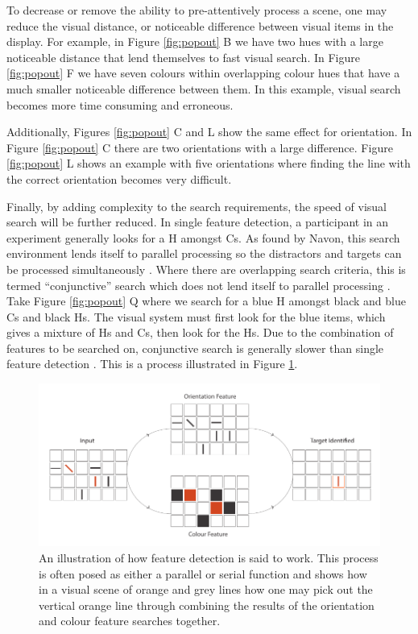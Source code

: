 To decrease or remove the ability to pre-attentively process a scene, one may reduce the visual distance, or noticeable difference between visual items in the display.
For example, in Figure \ref{fig:popout} B we have two hues with a large noticeable distance that lend themselves to fast visual search.
In Figure \ref{fig:popout} F we have seven colours within overlapping colour hues that have a much smaller noticeable difference between them.
In this example, visual search becomes more time consuming and erroneous.

Additionally, Figures \ref{fig:popout} C and L show the same effect for orientation.
In Figure \ref{fig:popout} C there are two orientations with a large difference.
Figure \ref{fig:popout} L shows an example with five orientations where finding the line with the correct orientation becomes very difficult.

Finally, by adding complexity to the search requirements, the speed of visual search will be further reduced.
In single feature detection, a participant in an experiment generally looks for a H amongst Cs. 
As found by Navon, this search environment lends itself to parallel processing so the distractors and targets can be processed simultaneously \cite{navon77}.
Where there are overlapping search criteria, this is termed ``conjunctive'' search which does not lend itself to parallel processing \cite{navon77}.
Take Figure \ref{fig:popout} Q where we search for a blue H amongst black and blue Cs and black Hs.
The visual system must first look for the blue items, which gives a mixture of Hs and Cs, then look for the Hs.
Due to the combination of features to be searched on, conjunctive search is generally slower than single feature detection \cite{quinlan87}.
This is a process illustrated in Figure \ref{fig:visual-search}.

\begin{figure}[t!]
\centering
\includegraphics[width=.8\textwidth]{images/related-work/visual-search.pdf}
\caption{An illustration of how feature detection is said to work. This process is often posed as either a parallel or serial function and shows how in a visual scene of orange and grey lines how one may pick out the vertical orange line through combining the results of the orientation and colour feature searches together.} 
\label{fig:visual-search}
\end{figure}

